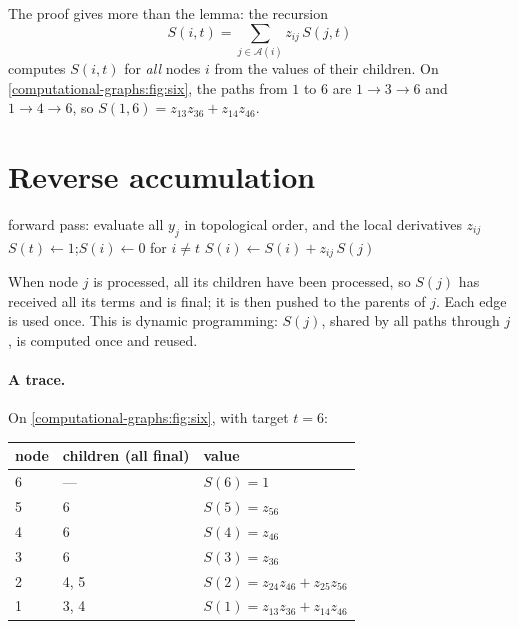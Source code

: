 \begin{notechapter}
The proof gives more than the lemma: the recursion
\[
  \boxed{S(i,t) = \sum_{j\in\mathcal A(i)}z_{ij}\,S(j,t)}
\]
computes $S(i,t)$ for \emph{all} nodes $i$ from the values of their children. On
\cref{computational-graphs:fig:six}, the paths from $1$ to $6$ are $1\to3\to6$ and $1\to4\to6$, so
$S(1,6) = z_{13}z_{36} + z_{14}z_{46}$.

\section{Reverse accumulation}\label{computational-graphs:sec:reverse}

\begin{algorithm}[ht]
\caption{Reverse accumulation of $\partial y_t/\partial y_i$ for all nodes $i$}\label{computational-graphs:alg:reverse}
\begin{algorithmic}[1]
\State forward pass: evaluate all $y_j$ in topological order, and the local derivatives $z_{ij}$
\State $S(t)\gets1$;\quad $S(i)\gets0$ for $i\neq t$
 
    \State $S(i)\gets S(i) + z_{ij}\,S(j)$ 
  \EndFor
\EndFor
\end{algorithmic}
\end{algorithm}

When node $j$ is processed, all its children have been processed, so $S(j)$ has received all its
terms and is final; it is then pushed to the parents of $j$. Each edge is used once. This is
dynamic programming: $S(j)$, shared by all paths through $j$, is computed once and reused.

\paragraph{A trace.} On \cref{computational-graphs:fig:six}, with target $t = 6$:

\begin{center}
\begin{tabular}{lll}
\toprule
node & children (all final) & value \\
\midrule
6 & --- & $S(6) = 1$ \\
5 & 6 & $S(5) = z_{56}$ \\
4 & 6 & $S(4) = z_{46}$ \\
3 & 6 & $S(3) = z_{36}$ \\
2 & 4, 5 & $S(2) = z_{24}z_{46} + z_{25}z_{56}$ \\
1 & 3, 4 & $S(1) = z_{13}z_{36} + z_{14}z_{46}$ \\
\bottomrule
\end{tabular}
\end{center}


\end{notechapter}
